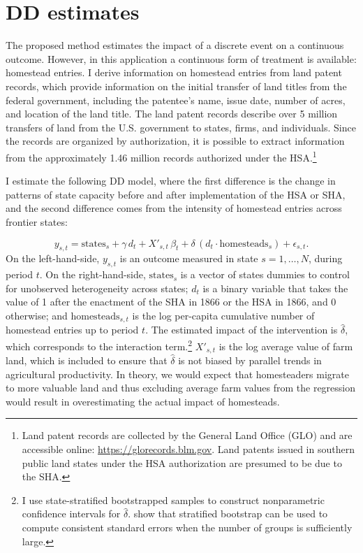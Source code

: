 \documentclass[12pt]{article}
\begin{document}
\section{DD estimates} \label{DD}

The proposed method estimates the impact of a discrete event on a continuous outcome. However, in this application a continuous form of treatment is available: homestead entries. I derive information on homestead entries from land patent records, which provide information on the initial transfer of land titles from the federal government, including the patentee's name, issue date, number of acres, and location of the land title. The land patent records describe over 5 million transfers of land from the U.S. government to states, firms, and individuals. Since the records are organized by authorization, it is possible to extract information from the approximately 1.46 million records authorized under the HSA.\footnote{Land patent records are collected by the General Land Office (GLO) and are accessible online: \url{https://glorecords.blm.gov}. Land patents issued in southern public land states under the HSA authorization are presumed to be due to the SHA.}

I estimate the following DD model, where the first difference is the change in patterns of state capacity before and after implementation of the HSA or SHA, and the second difference comes from the intensity of homestead entries across frontier states:

\begin{equation} 
y_{s, t} =  \text{states}_s + \gamma \, d_t + X'_{s,t} \, \beta_t + \delta \, (d_t \cdot \text{homesteads}_s) + \epsilon_{s, t}. \label{eq:dd} 
\end{equation} On the left-hand-side, $y_{s, t}$ is an outcome measured in state $s = 1, \ldots, N$, during period $t$. On the right-hand-side, $\text{states}_s$ is a vector of states dummies to control for unobserved heterogeneity across states; $d_t$ is a binary variable that takes the value of 1 after the enactment of the SHA in 1866 or the HSA in 1866, and 0 otherwise; and $\text{homesteads}_{s, t}$ is the log per-capita cumulative number of homestead entries up to period $t$. The estimated impact of the intervention is $\hat{\delta}$, which corresponds to the interaction term.\footnote{I use state-stratified bootstrapped samples to construct nonparametric confidence intervals for $\hat{\delta}$. \citet{bertrand2004much} show that stratified bootstrap can be used to compute consistent standard errors when the number of groups is sufficiently large.} $X'_{s,t}$ is the log average value of farm land, which is included to ensure that $\hat{\delta}$ is not biased by parallel trends in agricultural productivity. In theory, we would expect that homesteaders migrate to more valuable land and thus excluding average farm values from the regression would result in overestimating the actual impact of homesteads. 
\end{document}
